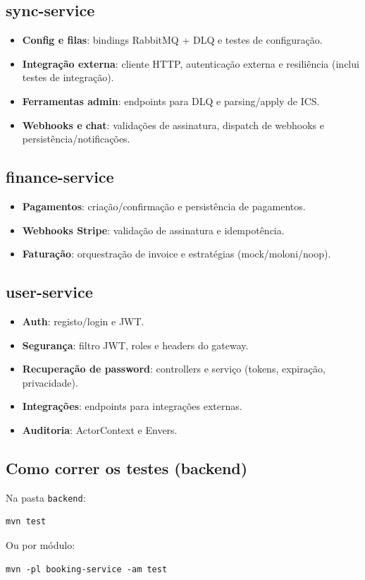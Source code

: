 \documentclass[11pt,a4paper]{article}
\begin{document}
\subsection{sync-service}
\begin{itemize}[nosep]
  \item \textbf{Config e filas}: bindings RabbitMQ + DLQ e testes de configuração.
  \item \textbf{Integração externa}: cliente HTTP, autenticação externa e resiliência (inclui testes de integração).
  \item \textbf{Ferramentas admin}: endpoints para DLQ e parsing/apply de ICS.
  \item \textbf{Webhooks e chat}: validações de assinatura, dispatch de webhooks e persistência/notificações.
\end{itemize}

\subsection{finance-service}
\begin{itemize}[nosep]
  \item \textbf{Pagamentos}: criação/confirmação e persistência de pagamentos.
  \item \textbf{Webhooks Stripe}: validação de assinatura e idempotência.
  \item \textbf{Faturação}: orquestração de invoice e estratégias (mock/moloni/noop).
\end{itemize}

\subsection{user-service}
\begin{itemize}[nosep]
  \item \textbf{Auth}: registo/login e JWT.
  \item \textbf{Segurança}: filtro JWT, roles e headers do gateway.
  \item \textbf{Recuperação de password}: controllers e serviço (tokens, expiração, privacidade).
  \item \textbf{Integrações}: endpoints para integrações externas.
  \item \textbf{Auditoria}: ActorContext e Envers.
\end{itemize}

\subsection{Como correr os testes (backend)}
Na pasta \texttt{backend}:
\begin{verbatim}
mvn test
\end{verbatim}
Ou por módulo:
\begin{verbatim}
mvn -pl booking-service -am test
\end{verbatim}
\end{document}
